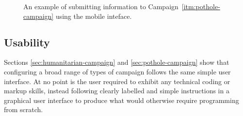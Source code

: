 \documentclass{article}
\begin{document}
		\begin{figure}[H]
			\centering
			\caption{An example of submitting information to Campaign~\ref{itm:pothole-campaign} using the mobile inteface.}
			\label{fig:eval-mobile-2}
		\end{figure}

		\FloatBarrier

		\subsection{Usability}

		Sections \ref{sec:humanitarian-campaign} and \ref{sec:pothole-campaign} show that configuring a broad range of types of campaign follows the same simple user interface. At no point is the user required to exhibit any technical coding or markup skills, instead following clearly labelled and simple instructions in a graphical user interface to produce what would otherwise require programming from scratch.
\end{document}
